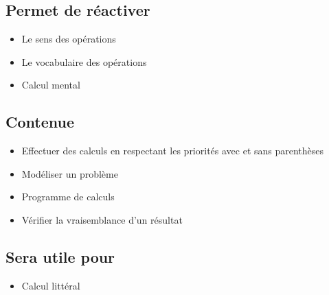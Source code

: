 \subsection{Permet de réactiver}
\begin{itemize}
    \item Le sens des opérations
    \item Le vocabulaire des opérations
    \item Calcul mental
\end{itemize}

\subsection{Contenue}
\begin{itemize}
    \item Effectuer des calculs en respectant les priorités avec et sans parenthèses
    \item Modéliser un problème
    \item Programme de calculs
    \item Vérifier la vraisemblance d'un résultat
\end{itemize}

\subsection{Sera utile pour}
\begin{itemize}
    \item Calcul littéral 
\end{itemize}